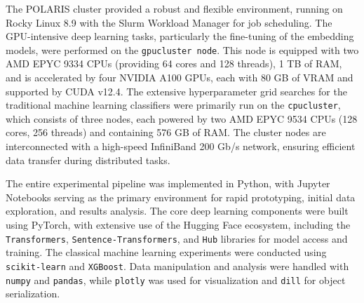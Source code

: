 The POLARIS cluster provided a robust and flexible environment, running on Rocky Linux 8.9 with the Slurm Workload Manager for job scheduling. The GPU-intensive deep learning tasks, particularly the fine-tuning of the embedding models, were performed on the \verb|gpucluster node|. This node is equipped with two AMD EPYC 9334 CPUs (providing 64 cores and 128 threads), 1 TB of RAM, and is accelerated by four NVIDIA A100 GPUs, each with 80 GB of VRAM and supported by CUDA v12.4. The extensive hyperparameter grid searches for the traditional machine learning classifiers were primarily run on the \verb|cpucluster|, which consists of three nodes, each powered by two AMD EPYC 9534 CPUs (128 cores, 256 threads) and containing 576 GB of RAM. The cluster nodes are interconnected with a high-speed InfiniBand 200 Gb/s network, ensuring efficient data transfer during distributed tasks.

The entire experimental pipeline was implemented in Python, with Jupyter Notebooks serving as the primary environment for rapid prototyping, initial data exploration, and results analysis. The core deep learning components were built using PyTorch, with extensive use of the Hugging Face ecosystem, including the \verb|Transformers|, \verb|Sentence-Transformers|, and \verb|Hub| libraries for model access and training. The classical machine learning experiments were conducted using \verb|scikit-learn| and \verb|XGBoost|. Data manipulation and analysis were handled with \verb|numpy| and \verb|pandas|, while \verb|plotly| was used for visualization and \verb|dill| for object serialization.

